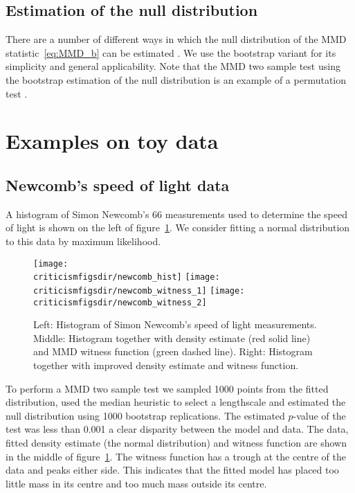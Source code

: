 \subsection{Estimation of the null distribution}

There are a number of different ways in which the null distribution of the MMD statistic~\eqref{eq:MMD_b} can be estimated \citep[e.g.][]{Gretton2008-gs}.
We use the bootstrap variant for its simplicity and general applicability.
Note that the MMD two sample test using the bootstrap estimation of the null distribution is an example of a permutation test .

\section{Examples on toy data}

\subsection{Newcomb's speed of light data}

A histogram of Simon Newcomb's 66 measurements used to determine the speed of light \citep{Stigler1977-dd} is shown on the left of figure~\ref{fig:newcomb}.
We consider fitting a normal distribution to this data by maximum likelihood.

\begin{figure}[ht]
\centering
\texttt{[image: \\criticismfigsdir/newcomb\_hist]}
\texttt{[image: \\criticismfigsdir/newcomb\_witness\_1]}
\texttt{[image: \\criticismfigsdir/newcomb\_witness\_2]}
\caption{
Left: Histogram of Simon Newcomb's speed of light measurements.
Middle: Histogram together with density estimate (red solid line) and MMD witness function (green dashed line).
Right: Histogram together with improved density estimate and witness function.
}
\label{fig:newcomb}
\end{figure}

To perform a MMD two sample test we sampled 1000 points from the fitted distribution, used the median heuristic to select a lengthscale and estimated the null distribution using 1000 bootstrap replications.
The estimated $p$-value of the test was less than 0.001 \ie a clear disparity between the model and data.
The data, fitted density estimate (the normal distribution) and witness function are shown in the middle of figure~\ref{fig:newcomb}.
The witness function has a trough at the centre of the data and peaks either side.
This indicates that the fitted model has placed too little mass in its centre and too much mass outside its centre.

